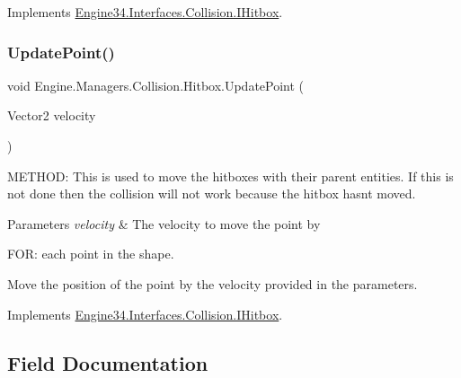 Implements \hyperlink{a00434_a50eba986052aa1f6ac4b49426ab31042}{Engine34.\+Interfaces.\+Collision.\+I\+Hitbox}.

\mbox{\label{a00506_ab5cba73c16189f63616a91cf19f00562}} 
\subsubsection{\texorpdfstring{Update\+Point()}{UpdatePoint()}}
{\footnotesize\ttfamily void Engine.\+Managers.\+Collision.\+Hitbox.\+Update\+Point (\begin{DoxyParamCaption}\item[{Vector2}]{velocity }\end{DoxyParamCaption})\hspace{0.3cm}{\ttfamily [inline]}}



M\+E\+T\+H\+OD\+: This is used to move the hitboxes with their parent entities. If this is not done then the collision will not work because the hitbox hasn\textquotesingle{}t moved. 


\begin{DoxyParams}{Parameters}
{\em velocity} & The velocity to move the point by\\
\hline
\end{DoxyParams}
F\+OR\+: each point in the shape.

Move the position of the point by the velocity provided in the parameters. 

Implements \hyperlink{a00434_ae50d408a05951b1e4db24bb468860103}{Engine34.\+Interfaces.\+Collision.\+I\+Hitbox}.



\subsection{Field Documentation}
\mbox{\label{a00506_a46b5b73419f520327a67808cd768a666}} 
